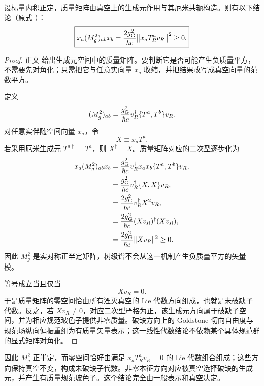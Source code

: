 \begin{proposition}
设标量内积正定，质量矩阵由真空上的生成元作用与其厄米共轭构造。则有以下结论（原式 ）：
\begin{equation*}
 \boxed{
 x_a(M_g^2)_{ab}x_b
 =\frac{2g_{\rm G}^2}{\hbar c}
 \bigl\|x_aT_R^av_R\bigr\|^2\ge0.}
\end{equation*}
\end{proposition}
\begin{proof}
正文 给出生成元空间中的质量矩阵。要判断它是否可能产生负质量平方，不需要先对角化；只需把它与任意实向量 \(x_a\) 收缩，并把结果改写成真空向量的范数平方。


定义
\begin{equation*}
 (M_g^2)_{ab}
 =\frac{g_{\rm G}^2}{\hbar c}
 v_R^\dagger\{T^a,T^b\}v_R.
\end{equation*}
对任意实伴随空间向量 $x_a$，令
\begin{equation*}
 X\equiv x_aT^a.
\end{equation*}
若采用厄米生成元 $T^{a\dagger}=T^a$，则 $X^\dagger=X$。质量矩阵对应的二次型逐步化为
\begin{align*}
 x_a(M_g^2)_{ab}x_b
 &=\frac{g_{\rm G}^2}{\hbar c}
 v_R^\dagger x_ax_b\{T^a,T^b\}v_R,\\
 &=\frac{g_{\rm G}^2}{\hbar c}
 v_R^\dagger\{X,X\}v_R,\\
 &=\frac{2g_{\rm G}^2}{\hbar c}v_R^\dagger X^2v_R,\\
 &=\frac{2g_{\rm G}^2}{\hbar c}(Xv_R)^\dagger(Xv_R),\\
 &=\frac{2g_{\rm G}^2}{\hbar c}\|Xv_R\|^2\ge0.
\end{align*}
因此 $M_g^2$ 是实对称正半定矩阵，树级谱不会从这一机制产生负质量平方的矢量模。

等号成立当且仅当
\begin{equation*}
 Xv_R=0.
\end{equation*}
于是质量矩阵的零空间恰由所有湮灭真空的 Lie 代数方向组成，也就是未破缺子代数。反之，若 $Xv_R\neq0$，对应二次型严格为正，该生成元方向属于破缺子空间，并为相应规范玻色子提供非零质量。破缺方向上的 Goldstone 切向自由度与规范场纵向偏振重组为有质量矢量表示；这一线性代数结论不依赖某个具体规范群的显式矩阵对角化。
\end{proof}

因此 $M_g^2$ 正半定，而零空间恰好由满足 $x_aT_R^av_R=0$ 的 Lie 代数组合组成；这些方向保持真空不变，构成未破缺子代数。非零本征方向对应被真空选择破缺的生成元，并产生有质量规范玻色子。这个结论完全由一般表示和真空决定。

